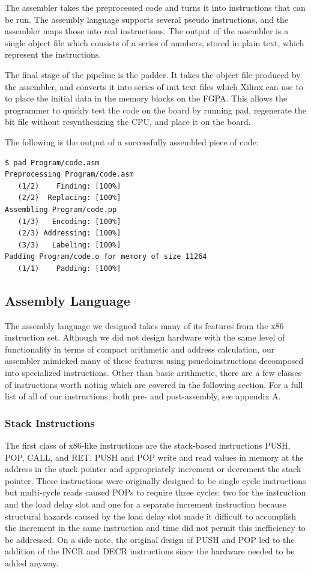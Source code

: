 \documentclass[onecolumn]{IEEEtran}
\begin{document}
The assembler takes the preprocessed code and turns it into instructions that can be run.  The assembly language supports several pseudo instructions, and the assembler maps those into real instructions.  The output of the assembler is a single object file which consists of a series of numbers, stored in plain text, which represent the instructions.

The final stage of the pipeline is the padder. It takes the object file produced by the assembler, and converts it into series of init text files which Xilinx can use to to place the initial data in the memory blocks on the FGPA.  This allows the programmer to quickly test the code on the board by running pad, regenerate the bit file without resynthesizing the CPU, and place it on the board.

The following is the output of a successfully assembled piece of code:

\begin{verbatim}
$ pad Program/code.asm
Preprocessing Program/code.asm
   (1/2)    Finding: [100%]
   (2/2)  Replacing: [100%]
Assembling Program/code.pp
   (1/3)   Encoding: [100%]
   (2/3) Addressing: [100%]
   (3/3)   Labeling: [100%]
Padding Program/code.o for memory of size 11264
   (1/1)    Padding: [100%]
\end{verbatim}

\subsection{Assembly Language}
The assembly language we designed takes many of its features from the x86 instruction set.  Although we did not design hardware with the same level of functionality in terms of compact arithmetic and address calculation, our assembler mimicked many of these features using psuedoinstructions decomposed into specialized instructions.  Other than basic arithmetic, there are a few classes of instructions worth noting which are covered in the following section.  For a full list of all of our instructions, both pre- and post-assembly, see appendix A.

\subsubsection{Stack Instructions}
The first class of x86-like instructions are the stack-based instructions PUSH, POP, CALL, and RET.  PUSH and POP write and read values in memory at the address in the stack pointer and appropriately increment or decrement the stack pointer.  These instructions were originally designed to be single cycle instructions but multi-cycle reads caused POPs to require three cycles: two for the instruction and the load delay slot and one for a separate increment instruction because structural hazards caused by the load delay slot made it difficult to accomplish the increment in the same instruction and time did not permit this inefficiency to be addressed.  On a side note, the original design of PUSH and POP led to the addition of the INCR and DECR instructions since the hardware needed to be added anyway.
\end{document}
